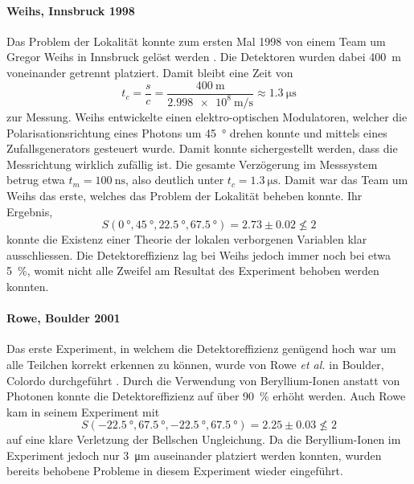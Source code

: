 \begin{refsection}
\paragraph{Weihs, Innsbruck 1998}
Das Problem der Lokalit\"at konnte zum ersten Mal 1998 von einem Team
um Gregor Weihs in Innsbruck gel\"ost werden \cite{Bell:Weihs1998}.
Die Detektoren wurden dabei \SI{400}{\meter} voneinander getrennt platziert.
Damit bleibt eine Zeit von
\[
    t_c = \frac{s}{c} = \frac{\SI{400}{\meter}}{\SI{2.998e8}{\meter\per\second}} \approx \SI{1.3}{\micro\second}
\]
zur Messung.
Weihs entwickelte einen elektro-optischen Modulatoren, welcher die 
Polarisationsrichtung eines Photons um \SI{45}{\degree} drehen konnte und
mittels eines Zufallsgenerators gesteuert wurde.
Damit konnte sichergestellt werden, dass die Messrichtung wirklich zuf\"allig
ist.
Die gesamte Verz\"ogerung im Messsystem betrug etwa 
$t_m = \SI{100}{\nano\second}$, also deutlich unter $t_c = \SI{1.3}{\micro\second}$. 
Damit war das Team um Weihs das erste, welches das Problem der Lokalit\"at
beheben konnte.
Ihr Ergebnis,
\[
    S(\SI{0}{\degree},\SI{45}{\degree},\SI{22.5}{\degree},\SI{67.5}{\degree})
    = 2.73 \pm 0.02 \nleqslant 2
\]
konnte die Existenz einer Theorie der lokalen verborgenen Variablen klar 
ausschliessen.
Die Detektoreffizienz lag bei Weihs jedoch immer noch bei etwa \SI{5}{\percent},
womit nicht alle Zweifel am Resultat des Experiment behoben werden konnten.

\paragraph{Rowe, Boulder 2001}
Das erste Experiment, in welchem die Detektoreffizienz gen\"ugend hoch war um
alle Teilchen korrekt erkennen zu k\"onnen, wurde von Rowe \textit{et al.}
in Boulder, Colordo durchgef\"uhrt \cite{Bell:Rowe2001}. 
Durch die Verwendung von Beryllium-Ionen anstatt von Photonen konnte die
Detektoreffizienz auf \"uber \SI{90}{\percent} erh\"oht werden.
Auch Rowe kam in seinem Experiment mit
\[
    S(\SI{-22.5}{\degree},\SI{67.5}{\degree},\SI{-22.5}{\degree},\SI{67.5}{\degree})
    = 2.25 \pm 0.03 \nleqslant 2
\]
auf eine klare Verletzung der Bellschen Ungleichung.
Da die Beryllium-Ionen im Experiment jedoch nur \SI{3}{\micro\meter}
auseinander platziert werden konnten, wurden bereits behobene Probleme in
diesem Experiment wieder eingef\"uhrt.


\end{refsection}
